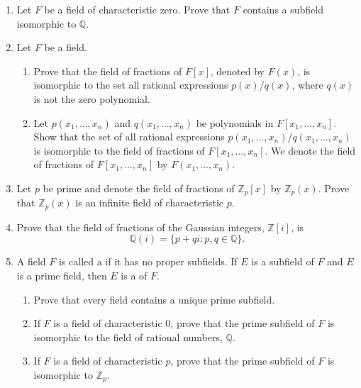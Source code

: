 {\begin{enumerate}
 
\item
Let $F$ be a field of characteristic zero. Prove that $F$ contains a
subfield isomorphic to ${\mathbb Q}$.
 
\item
Let $F$ be a field.
\begin{enumerate}

 \item
Prove that the field of fractions of $F[x]$, denoted by
$F(x)$\label{noteratfun},  is isomorphic to the set all rational
expressions $p(x) / q(x)$, where $q(x)$ is not the zero polynomial. 

 \item
Let $p(x_1, \ldots, x_n)$ and $q(x_1, \ldots, x_n)$ be polynomials in
$F[x_1, \ldots, x_n]$. Show that the set of all rational expressions
$p(x_1, \ldots, x_n) / q(x_1, \ldots, x_n)$ is isomorphic to the field
of fractions of $F[x_1, \ldots, x_n]$.  We denote the field of
fractions of $F[x_1, \ldots, x_n]$ by $F(x_1, \ldots,
x_n)$\label{noteratnvar}.    

\end{enumerate}


\item
Let $p$ be prime and denote the field of fractions of ${\mathbb Z}_p[x]$
by ${\mathbb Z}_p(x)$.  Prove that ${\mathbb Z}_p(x)$ is an infinite field
of characteristic $p$. 

 
\item
Prove that the field of fractions of the Gaussian integers, ${\mathbb
Z}[i]$, is 
\[
{\mathbb Q}(i) = \{ p + q i : p, q \in {\mathbb Q}  \}.
\]

 
\item
A field $F$ is called a  if it has no proper
subfields. If $E$ is a subfield of $F$ and $E$ is a prime field, then  
$E$ is a  of $F$. 
\begin{enumerate}
 
 \item
Prove that every field contains a unique prime subfield.
 
 \item
If $F$ is a field of characteristic 0, prove that the prime subfield
of $F$ is isomorphic to the field of rational numbers, ${\mathbb Q}$.
 
 \item
If $F$ is a field of characteristic $p$, prove that the prime subfield
of $F$ is isomorphic to  ${\mathbb Z}_p$. 
 

\end{enumerate}
\end{enumerate}}
